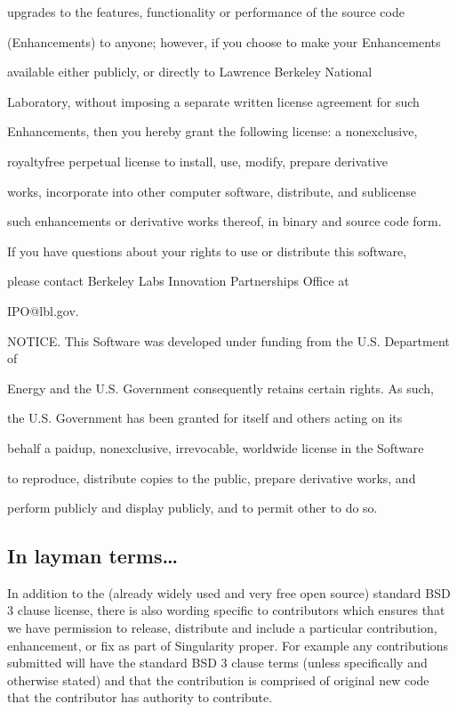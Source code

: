\documentclass[letterpaper,10pt,english]{sphinxmanual}
\begin{document}
\begin{sphinxVerbatim}[commandchars=\\\{\}]
upgrades to the features, functionality or performance of the source code

(\PYGZdq{}Enhancements\PYGZdq{}) to anyone; however, if you choose to make your Enhancements

available either publicly, or directly to Lawrence Berkeley National

Laboratory, without imposing a separate written license agreement for such

Enhancements, then you hereby grant the following license: a  non\PYGZhy{}exclusive,

royalty\PYGZhy{}free perpetual license to install, use, modify, prepare derivative

works, incorporate into other computer software, distribute, and sublicense

such enhancements or derivative works thereof, in binary and source code form.


If you have questions about your rights to use or distribute this software,

please contact Berkeley Lab\PYGZsq{}s Innovation \PYGZam{} Partnerships Office at

IPO@lbl.gov.


NOTICE.  This Software was developed under funding from the U.S. Department of

Energy and the U.S. Government consequently retains certain rights. As such,

the U.S. Government has been granted for itself and others acting on its

behalf a paid\PYGZhy{}up, nonexclusive, irrevocable, worldwide license in the Software

to reproduce, distribute copies to the public, prepare derivative works, and

perform publicly and display publicly, and to permit other to do so.
\end{sphinxVerbatim}


\subsection{In layman terms…}
\label{\detokenize{installation_environments:in-layman-terms}}
In addition to the (already widely used and very free open source)
standard BSD 3 clause license, there is also wording specific to
contributors which ensures that we have permission to release,
distribute and include a particular contribution, enhancement, or fix as
part of Singularity proper. For example any contributions submitted will
have the standard BSD 3 clause terms (unless specifically and otherwise
stated) and that the contribution is comprised of original new code that
the contributor has authority to contribute.
\end{document}
